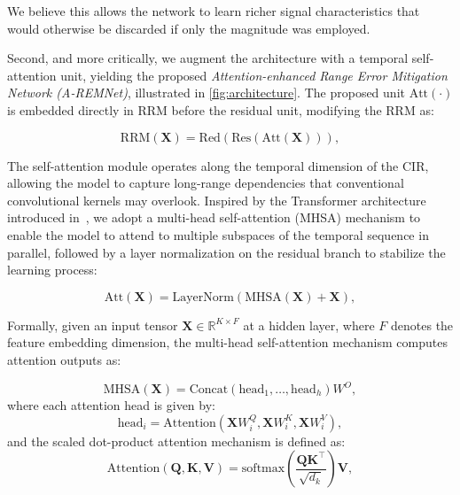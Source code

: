 We believe this allows the network to learn richer signal characteristics that would otherwise be discarded if only the magnitude was employed.

Second, and more critically, we augment the architecture with a temporal self-attention unit, yielding the proposed \emph{Attention-enhanced Range Error Mitigation Network (A-REMNet)}, illustrated in \autoref{fig:architecture}. The proposed unit $\text{Att}(\cdot)$ is embedded directly in RRM before the residual unit, modifying the RRM as:

\begin{equation}
    \text{RRM}(\mathbf{X}) = \text{Red}(\text{Res}(\text{Att}(\mathbf{X}))),
\end{equation}

The self-attention module operates along the temporal dimension of the CIR, allowing the model to capture long-range dependencies that conventional convolutional kernels may overlook. Inspired by the Transformer architecture introduced in~\cite{attention}, we adopt a multi-head self-attention (MHSA) mechanism to enable the model to attend to multiple subspaces of the temporal sequence in parallel, followed by a layer normalization on the residual branch to stabilize the learning process:

\begin{equation}
    \text{Att}(\mathbf{X}) = \text{LayerNorm}(\text{MHSA}(\mathbf{X}) + \mathbf{X}),
\end{equation}

Formally, given an input tensor $\mathbf{X} \in \mathbb{R}^{K \times F}$ at a hidden layer, where $F$ denotes the feature embedding dimension, the multi-head self-attention mechanism computes attention outputs as:

\begin{equation}
    \text{MHSA}(\mathbf{X}) = \text{Concat}(\text{head}_1, \dots, \text{head}_h) W^O,
\end{equation}
where each attention head is given by:
\begin{equation}
    \text{head}_i = \text{Attention}(\mathbf{X} W_i^Q, \mathbf{X} W_i^K, \mathbf{X} W_i^V),
\end{equation}
and the scaled dot-product attention mechanism is defined as:
\begin{equation}
    \text{Attention}(\mathbf{Q}, \mathbf{K}, \mathbf{V}) = \text{softmax}\left( \frac{\mathbf{Q} \mathbf{K}^\top}{\sqrt{d_k}} \right) \mathbf{V},
\end{equation}

